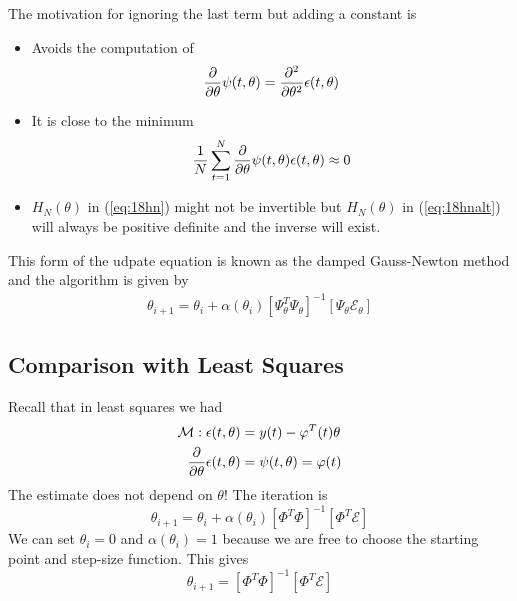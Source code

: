 The motivation for ignoring the last term but adding a constant is
\begin{itemize}
\item Avoids the computation of
$$\frac{\partial}{\partial\theta}\psi(t,\theta) = \frac{\partial^2}{\partial\theta^2}\epsilon(t,\theta)$$
\item It is close to the minimum
$$\frac{1}{N}\sum_{t=1}^N\frac{\partial}{\partial\theta}\psi(t,\theta)\epsilon(t,\theta) \approx 0$$
\item $H_N(\theta)$ in (\ref{eq:18hn}) might not be invertible but $H_N(\theta)$ in (\ref{eq:18hnalt}) will always be positive definite and the inverse will exist.
\end{itemize}
This form of the udpate equation is known as the damped Gauss-Newton method and the algorithm is given by
\begin{align*}
\boxed{\theta_{i+1} = \theta_i + \alpha(\theta_i)\left[\Psi_\theta^T\Psi_\theta\right]^{-1} \left[\Psi_\theta\mathcal{E}_\theta\right]}
\end{align*}

\subsection{Comparison with Least Squares}
Recall that in least squares we had
\begin{align*}
\mathcal{M}: \epsilon(t,\theta) &= y(t) - \varphi^T(t)\theta \\
\frac{\partial}{\partial\theta}\epsilon(t,\theta) &= \psi(t,\theta) = \varphi(t)
\end{align*}
The estimate does not depend on $\theta$! The iteration is
$$\theta_{i+1} = \theta_i + \alpha(\theta_i)\left[\Phi^T\Phi\right]^{-1}\left[\Phi^T\mathcal{E}\right]$$
We can set $\theta_i=0$ and $\alpha(\theta_i)=1$ because we are free to choose the starting point and step-size function. This gives
$$\theta_{i+1} = \left[\Phi^T\Phi\right]^{-1}\left[\Phi^T\mathcal{E}\right]$$

